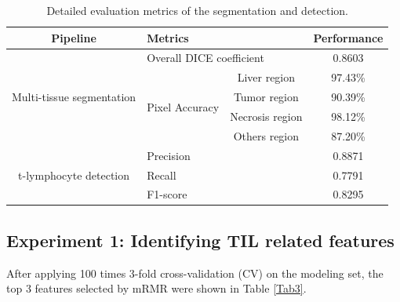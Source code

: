 \documentclass[num-refs]{wiley-article}
\begin{document}
\begin{table}[htbp]
  \centering
  \caption{Detailed evaluation metrics of the segmentation and detection.}
    \begin{tabular}{|c|p{5.535em}c|c|}
    \toprule
    \multicolumn{1}{|p{5.25em}|}{\textbf{Pipeline}} & \multicolumn{2}{p{11.5em}|}{\textbf{Metrics}} & \multicolumn{1}{p{5.5em}|}{\textbf{Performance}} \\
    \midrule
    \multicolumn{1}{|c|}{\multirow{5}[10]{*}{Multi-tissue segmentation}} & \multicolumn{2}{p{11.5em}|}{Overall DICE coefficient} & 0.8603 \\
\cmidrule{2-4}          & \multicolumn{1}{c|}{\multirow{4}[8]{*}{Pixel Accuracy}} & \multicolumn{1}{p{6.20em}|}{Liver region} & 97.43\% \\
\cmidrule{3-4}          & \multicolumn{1}{c|}{} & \multicolumn{1}{p{6.20em}|}{Tumor region} & 90.39\% \\
\cmidrule{3-4}          & \multicolumn{1}{c|}{} & \multicolumn{1}{p{6.20em}|}{Necrosis region} & 98.12\% \\
\cmidrule{3-4}          & \multicolumn{1}{c|}{} & \multicolumn{1}{p{6.20em}|}{Others region} & 87.20\% \\
    \midrule
    \multicolumn{1}{|c|}{\multirow{3}[6]{*}{t-lymphocyte detection}} & \multicolumn{2}{p{11.5em}|}{Precision} & 0.8871 \\
\cmidrule{2-4}          & \multicolumn{2}{p{11.5em}|}{Recall} & 0.7791 \\
\cmidrule{2-4}          & \multicolumn{2}{p{11.5em}|}{F1-score} & 0.8295 \\
    \bottomrule
    \end{tabular}%
  \label{Tab2}%
\end{table}%
 
\subsection{Experiment 1: Identifying TIL related features}
After applying 100 times 3-fold cross-validation (CV) on the modeling set, the top 3 features selected by mRMR were shown in Table \ref{Tab3}. 
\end{document}

